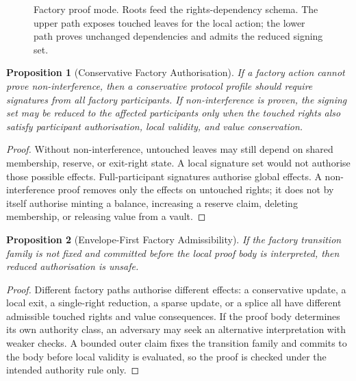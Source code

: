 \documentclass[a4paper,11pt]{article}
\newtheorem{proposition}{Proposition}
\begin{document}
\begin{figure}[H]
\caption{Factory proof mode. Roots feed the rights-dependency schema. The upper path exposes touched leaves for the local action; the lower path proves unchanged dependencies and admits the reduced signing set.}
\label{fig:factory-proof}
\end{figure}

\begin{proposition}[Conservative Factory Authorisation]
If a factory action cannot prove non-interference, then a conservative protocol profile should require signatures from all factory participants. If non-interference is proven, the signing set may be reduced to the affected participants only when the touched rights also satisfy participant authorisation, local validity, and value conservation.
\end{proposition}

\begin{proof}
Without non-interference, untouched leaves may still depend on shared membership, reserve, or exit-right state. A local signature set would not authorise those possible effects. Full-participant signatures authorise global effects. A non-interference proof removes only the effects on untouched rights; it does not by itself authorise minting a balance, increasing a reserve claim, deleting membership, or releasing value from a vault.
\end{proof}

\begin{proposition}[Envelope-First Factory Admissibility]
If the factory transition family is not fixed and committed before the local proof body is interpreted, then reduced authorisation is unsafe.
\end{proposition}

\begin{proof}
Different factory paths authorise different effects: a conservative update, a local exit, a single-right reduction, a sparse update, or a splice all have different admissible touched rights and value consequences. If the proof body determines its own authority class, an adversary may seek an alternative interpretation with weaker checks. A bounded outer claim fixes the transition family and commits to the body before local validity is evaluated, so the proof is checked under the intended authority rule only.
\end{proof}
\end{document}
